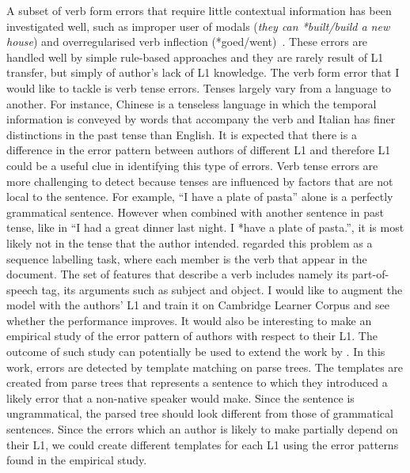 \documentclass[11pt]{article}
\begin{document}
A subset of verb form errors that require little contextual information has been investigated well, such as improper user of modals (\emph{they can *built/build a new house}) and overregularised verb inflection (*goed/went)~\citep{chodorow2000unsupervised, leacock2003automated}. These errors are handled well by simple rule-based approaches and they are rarely result of L1 transfer, but simply of author's lack of L1 knowledge. The verb form error that I would like to tackle is verb tense errors. Tenses largely vary from a language to another. For instance, Chinese is a tenseless language in which the temporal information is conveyed by words that accompany the verb and Italian has finer distinctions in the past tense than English. It is expected that there is a difference in the error pattern between authors of different L1 and therefore L1 could be a useful clue in identifying this type of errors. Verb tense errors are more challenging to detect because tenses are influenced by factors that are not local to the sentence. For example, ``I have a plate of pasta'' alone is a perfectly grammatical sentence. However when combined with another sentence in past tense, like in ``I had a great dinner last night. I *have a plate of pasta.'', it is most likely not in the tense that the author intended. \cite{tajiri2012tense} regarded this problem as a sequence labelling task, where each member is the verb that appear in the document. The set of features that describe a verb includes namely its part-of-speech tag, its arguments such as subject and object. I would like to augment the model with the authors' L1 and train it on Cambridge Learner Corpus and see whether the performance improves. It would also be interesting to make an empirical study of the error pattern of authors with respect to their L1. The outcome of such study can potentially be used to extend the work by \cite{lee2008correcting}. In this work, errors are detected by template matching on parse trees. The templates are created from parse trees that represents a sentence to which they introduced a likely error that a non-native speaker would make. Since the sentence is ungrammatical, the parsed tree should look different from those of grammatical sentences. Since the errors which an author is likely to make partially depend on their L1, we could create different templates for each L1 using the error patterns found in the empirical study.
\end{document}
